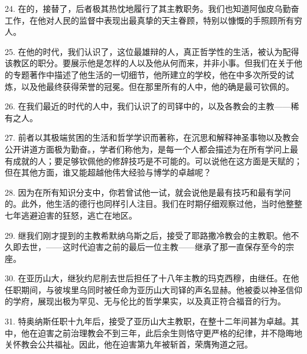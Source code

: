 24. 在的，接替了，后者极其热忱地履行了其主教职务。我们也知道阿伽皮乌勤奋工作，在他对人民的监督中表现出最真挚的天主眷顾，特别以慷慨的手照顾所有穷人。\par

25. 在他的时代，我们认识了，这位最雄辩的人，真正哲学性的生活，被认为配得该教区的职分。要展示他是怎样的人以及他从何而来，并非小事。但我们在关于他的专题著作中描述了他生活的一切细节，他所建立的学校，他在中多次所受的试炼，以及他最终获得荣誉的冠冕。但在那里所有的人中，他的确是最可钦佩的。\par

26. 在我们最近的时代的人中，我们认识了的司铎中的，以及各教会的主教——稀有之人。\par

27. 前者以其极端贫困的生活和哲学学识而著称，在沉思和解释神圣事物以及教会公开讲道方面极为勤奋。，学者们称他为，是每一个人都会描述为在所有学问上最有成就的人；要足够钦佩他的修辞技巧是不可能的。可以说他在这方面是天赋的；但在其他方面，谁又能超越他伟大经验与博学的卓越呢？\par

28. 因为在所有知识分支中，你若曾试他一试，就会说他是最有技巧和最有学问的。此外，他生活的德行也同样引人注目。我们在时期仔细观察过他，当时他整整七年逃避迫害的狂怒，逃亡在地区。\par

29. 继我们刚才提到的主教希默纳乌斯之后，接受了耶路撒冷教会的主教职。他不久即去世，——这时代迫害之前的最后一位主教——继承了那一直保存至今的宗座。\par

30. 在亚历山大，继狄约尼削去世后担任了十八年主教的玛克西穆，由继任。在他任职期间，与彼埃里乌同时被任命为亚历山大司铎的声名显赫。他被委以神圣信仰的学府，展现出极为罕见、无与伦比的哲学果实，以及真正符合福音的行为。\par

31. 特奥纳斯任职十九年后，接受了亚历山大主教职，在整十二年间甚为卓越。其中，他在迫害之前治理教会不到三年，此后余生则恪守更严格的纪律，并不隐晦地关怀教会公共福祉。因此，他在迫害第九年被斩首，荣膺殉道之冠。\par

